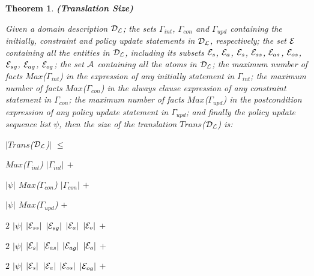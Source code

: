\documentclass[11pt]{report}
\newtheorem{vvtheorem}{Theorem}[chapter]
\newenvironment{vtheorem}[1]
{
  \begin{vvtheorem}{{\bf (#1)}}
}
{
  \end{vvtheorem}
}
\newenvironment{vquote}
{
  \begin{list}{}{\leftmargin 1em}\item[]
}
{
  \end{list}
}
\begin{document}
        \begin{vtheorem}{Translation Size}
          \label{theo-langl-tsize}
          Given a domain description ${\cal D_{L}}$; the sets $\Gamma_{int}$,
          $\Gamma_{con}$ and $\Gamma_{upd}$ containing the initially,
          constraint and policy update statements in ${\cal D_{L}}$,
          respectively; the set ${\cal E}$ containing all the entities in
          ${\cal D_{L}}$, including its subsets ${\cal E}_{s}$,
          ${\cal E}_{a}$, ${\cal E}_{s}$, ${\cal E}_{ss}$, ${\cal E}_{as}$,
          ${\cal E}_{os}$, ${\cal E}_{sg}$, ${\cal E}_{ag}$, ${\cal E}_{og}$;
          the set ${\cal A}$ containing all the atoms in ${\cal D_{L}}$; the
          maximum number of facts $Max$($\Gamma_{int}$) in the expression of
          any {\em initially} statement in $\Gamma_{int}$; the maximum
          number of facts $Max$($\Gamma_{con}$) in the {\em always} clause
          expression of any constraint statement in $\Gamma_{con}$; the
          maximum number of facts $Max$($\Gamma_{upd}$) in the postcondition
          expression of any policy update statement in $\Gamma_{upd}$; and
          finally the policy update sequence list $\psi$, then the size of
          the translation $Trans$(${\cal D_{L}}$) is:

          \begin{vquote}
            $|$$Trans$(${\cal D_{L}}$)$|$ $\leq$

            \hspace{1em}
            $Max$($\Gamma_{int}$) $|\Gamma_{int}|$ $+$

            \hspace{1em}
            $|\psi|$ $Max$($\Gamma_{con}$) $|\Gamma_{con}|$ $+$

            \hspace{1em}
            $|\psi|$ $Max$($\Gamma_{upd}$) $+$

            \hspace{1em}
            $2$ $|\psi|$ $|{\cal E}_{ss}|$ $|{\cal E}_{sg}|$ $|{\cal E}_{a}|$ $|{\cal E}_{o}|$ $+$

            \hspace{1em}
            $2$ $|\psi|$ $|{\cal E}_{s}|$ $|{\cal E}_{as}|$ $|{\cal E}_{ag}|$ $|{\cal E}_{o}|$ $+$

            \hspace{1em}
            $2$ $|\psi|$ $|{\cal E}_{s}|$ $|{\cal E}_{a}|$ $|{\cal E}_{os}|$ $|{\cal E}_{og}|$ $+$


\end{vquote}
\end{vtheorem}
\end{document}
